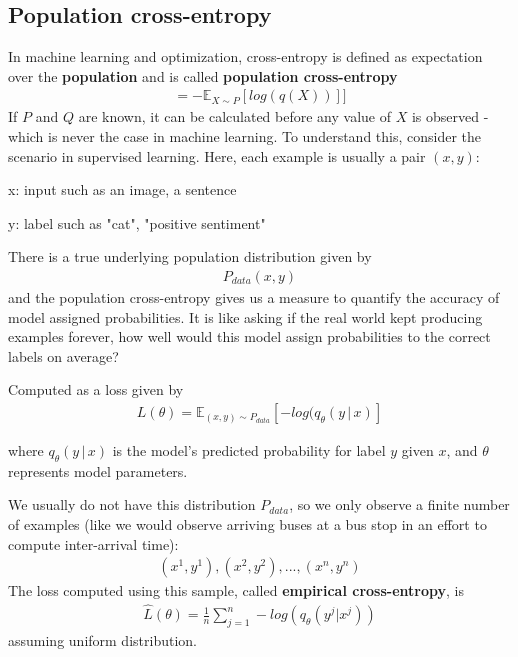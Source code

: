 \documentclass[fleqn, 12pt]{article}
\begin{document}
\subsection{Population cross-entropy}
In machine learning and optimization, cross-entropy is defined as expectation over the \textbf{population} and is called \textbf{population cross-entropy}
\begin{align}
    = -\mathbb{E}_{X\sim P}[log(q(X))]]
\end{align}
If $P$ and $Q$ are known, it can be calculated before any value of $X$ is observed - which is never the case in machine learning. To understand this, consider the scenario in supervised learning. Here, each example is usually a pair $(x, y)$:

\hspace{40pt} x: input such as an image, a sentence

\hspace{40pt} y: label such as "cat", "positive sentiment"

There is a true underlying population distribution given by
\begin{align}
    P_{data}(x, y)
\end{align}
and the population cross-entropy gives us a measure to quantify the accuracy of model assigned probabilities. It is like asking if the real world kept producing examples forever, how well would this model assign probabilities to the correct labels on average? 

Computed as a loss given by 
\begin{align}
    L(\theta) = \mathbb{E}_{(x, y) \sim P_{data}} [-log(q_{\theta} (y\,|\,x)]
\end{align}

where $q_{\theta}(y\,|\,x)$ is the model's predicted probability for label $y$ given $x$, and $\theta$ represents model parameters.

We usually do not have this distribution $P_{data}$, so we only observe a finite number of examples (like we would observe arriving buses at a bus stop in an effort to compute inter-arrival time):
\begin{align}
    (x^1, y^1), (x^2, y^2), ... , (x^n, y^n)
\end{align}
The loss computed using this sample, called \textbf{empirical cross-entropy}, is
\begin{align}
    \hat{L}(\theta) = \frac{1}{n} \sum_{j=1}^{n} -log(q_{\theta} (y^j | x^j))
\end{align}
assuming uniform distribution.
\end{document}
